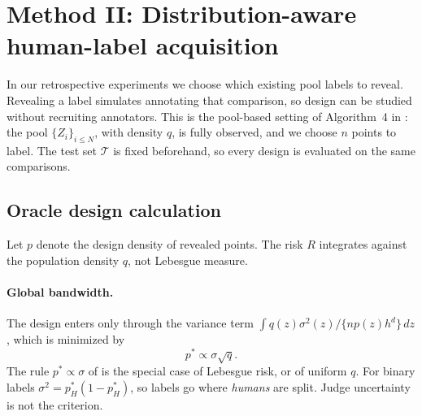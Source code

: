 \section{Method II: Distribution-aware human-label acquisition}
\label{sec:acquisition}

In our retrospective experiments we choose which existing pool labels to reveal. Revealing a label
simulates annotating that comparison, so design can be studied without recruiting annotators. This
is the pool-based setting of Algorithm~4 in \citet{li2026personalizing}: the pool $\{Z_i\}_{i\le N}$,
with density $q$, is fully observed, and we choose $n$ points to label. The test set $\mathcal T$ is
fixed beforehand, so every design is evaluated on the same comparisons.

\subsection{Oracle design calculation}

Let $p$ denote the design density of revealed points. The risk $R$ integrates against the
population density $q$, not Lebesgue measure.

\paragraph{Global bandwidth.}
The design enters only through the variance term $\int q(z)\sigma^2(z)/\{np(z)h^d\}\,dz$, which is
minimized by
\[
  p^{*}\propto\sigma\sqrt q .
\]
The rule $p^{*}\propto\sigma$ of \citet{li2026personalizing} is the special case of Lebesgue risk, or
of uniform $q$. For binary labels $\sigma^2=p_H^{*}(1-p_H^{*})$, so labels go where \emph{humans} are
split. Judge uncertainty is not the criterion.

